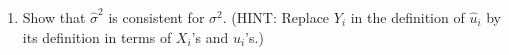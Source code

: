 \documentclass[11pt]{article}
\newcommand{\Blue}{\color{blue}}
\begin{document}
\begin{enumerate}
\begin{enumerate}


	\item  Show that $\hat \sigma^2$ is consistent for $\sigma^2$. (HINT: Replace $Y_i$ in the definition of $\hat u_i$ by its definition in terms of $X_i$'s and $u_i$'s.)



\end{enumerate}
\end{enumerate}
\end{document}
